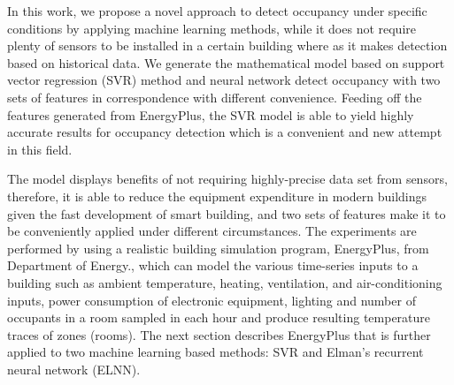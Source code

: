 
In this work, we propose a novel approach to detect occupancy under
specific conditions by applying machine learning methods, while it
does not require plenty of sensors to be installed in a certain
building where as it makes detection based on historical data. We
generate the mathematical model based on support vector regression
(SVR) method and neural network detect occupancy with two sets of
features in correspondence with different convenience. Feeding off the
features generated from EnergyPlus, the SVR model is able to yield
highly accurate results for occupancy detection which is a convenient
and new attempt in this field.

The model displays benefits of not requiring highly-precise data set
from sensors, therefore, it is able to reduce the equipment
expenditure in modern buildings given the fast development of smart
building, and two sets of features make it to be conveniently applied
under different circumstances. The experiments are performed by using
a realistic building simulation program, EnergyPlus, from Department of
Energy., which can model the various time-series inputs to a building
such as ambient temperature, heating, ventilation, and
air-conditioning inputs, power consumption of electronic equipment,
lighting and number of occupants in a room sampled in each hour and
produce resulting temperature traces of zones (rooms). The next
section describes EnergyPlus that is further applied to two machine
learning based methods: SVR and Elman's recurrent neural network (ELNN).
